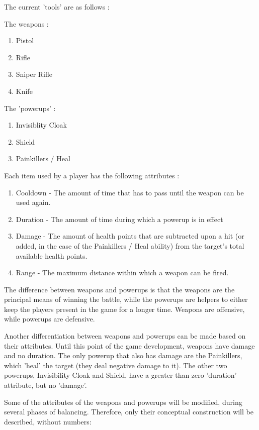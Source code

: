 The current 'tools' are as follows :\newline

The weapons : 
\begin{enumerate}
  \item Pistol
  \item Rifle
  \item Sniper Rifle
  \item Knife   
\end{enumerate}

The 'powerups' :
\begin{enumerate}
  \item Invisiblity Cloak
  \item Shield
  \item Painkillers / Heal
\end{enumerate}

Each item used by a player has the following attributes : 
\begin{enumerate}
  \item Cooldown - The amount of time that has to pass until the weapon can be
  used again.
  \item Duration - The amount of time during which a powerup is in effect 
  \item Damage - The amount of health points that are subtracted upon a hit (or
  added, in the case of the Painkillers / Heal ability) from the target's total
  available health points.
  \item Range - The maximum distance within which a weapon can be fired.
\end{enumerate}

The difference between weapons and powerups is that the weapons are the
principal means of winning the battle, while the powerups are helpers to either
keep the players present in the game for a longer time. Weapons are offensive,
while powerups are defensive.\newline

Another differentiation between weapons and powerups can be made based on their
attributes. Until this point of the game development, weapons have damage and no
duration. The only powerup that also has damage are the Painkillers, which
'heal' the target (they deal negative damage to it). The other two powerups,
Invisibility Cloak and Shield, have a greater than zero 'duration' attribute,
but no 'damage'.\newline

Some of the attributes of the weapons and powerups will be modified, during
several phases of balancing. Therefore, only their conceptual construction will
be described, without numbers:

